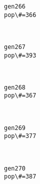 \documentclass[11pt]{article}
\begin{document}
    \begin{Verbatim}[commandchars=\\\{\}]
gen266
pop\#=366

    \end{Verbatim}

    \begin{center}
    \end{center}
    { \hspace*{\fill} \\}
    
    \begin{Verbatim}[commandchars=\\\{\}]
gen267
pop\#=393

    \end{Verbatim}

    \begin{center}
    \end{center}
    { \hspace*{\fill} \\}
    
    \begin{Verbatim}[commandchars=\\\{\}]
gen268
pop\#=367

    \end{Verbatim}

    \begin{center}
    \end{center}
    { \hspace*{\fill} \\}
    
    \begin{Verbatim}[commandchars=\\\{\}]
gen269
pop\#=377

    \end{Verbatim}

    \begin{center}
    \end{center}
    { \hspace*{\fill} \\}
    
    \begin{Verbatim}[commandchars=\\\{\}]
gen270
pop\#=387

    \end{Verbatim}
\end{document}
